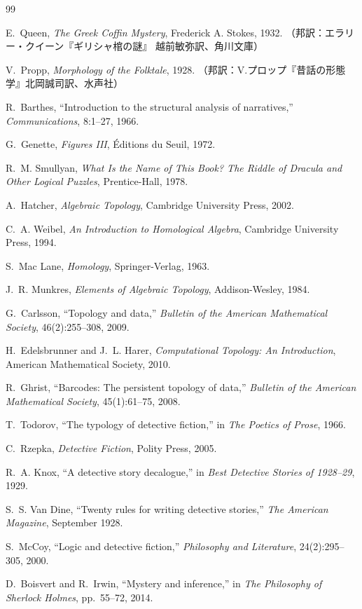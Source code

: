 \documentclass[12pt,twocolumn]{ltjsarticle}
\begin{document}
\begin{thebibliography}{99}

E.~Queen,
\textit{The Greek Coffin Mystery},
Frederick A. Stokes, 1932.
（邦訳：エラリー・クイーン『ギリシャ棺の謎』
越前敏弥訳、角川文庫）

V.~Propp,
\textit{Morphology of the Folktale},
1928.
（邦訳：V.プロップ『昔話の形態学』北岡誠司訳、水声社）

R.~Barthes,
``Introduction to the structural analysis of narratives,''
\textit{Communications}, 8:1--27, 1966.

G.~Genette,
\textit{Figures III},
\'{E}ditions du Seuil, 1972.

R.~M. Smullyan,
\textit{What Is the Name of This Book?
The Riddle of Dracula and Other Logical Puzzles},
Prentice-Hall, 1978.

A.~Hatcher,
\textit{Algebraic Topology},
Cambridge University Press, 2002.

C.~A. Weibel,
\textit{An Introduction to Homological Algebra},
Cambridge University Press, 1994.

S.~Mac Lane,
\textit{Homology},
Springer-Verlag, 1963.

J.~R. Munkres,
\textit{Elements of Algebraic Topology},
Addison-Wesley, 1984.

G.~Carlsson,
``Topology and data,''
\textit{Bulletin of the American Mathematical Society},
46(2):255--308, 2009.

H.~Edelsbrunner and J.~L. Harer,
\textit{Computational Topology: An Introduction},
American Mathematical Society, 2010.

R.~Ghrist,
``Barcodes: The persistent topology of data,''
\textit{Bulletin of the American Mathematical Society},
45(1):61--75, 2008.

T.~Todorov,
``The typology of detective fiction,''
in \textit{The Poetics of Prose}, 1966.

C.~Rzepka,
\textit{Detective Fiction},
Polity Press, 2005.

R.~A. Knox,
``A detective story decalogue,''
in \textit{Best Detective Stories of 1928--29}, 1929.

S.~S. Van Dine,
``Twenty rules for writing detective stories,''
\textit{The American Magazine}, September 1928.

S.~McCoy,
``Logic and detective fiction,''
\textit{Philosophy and Literature}, 24(2):295--305, 2000.

D.~Boisvert and R.~Irwin,
``Mystery and inference,''
in \textit{The Philosophy of Sherlock Holmes},
pp.~55--72, 2014.

\end{thebibliography}
\end{document}
